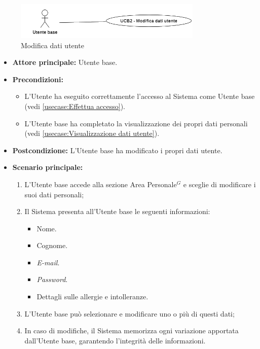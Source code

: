 \label{usecase:Modifica dati utente}

\begin{figure}[h]
	\centering
	\includegraphics[width=0.8\textwidth]{./uml/UCB2.png} 
	\caption{Modifica dati utente}
	\label{fig:UCB2}
  \end{figure}

\begin{itemize}
	\item \textbf{Attore principale:} Utente base.

	\item \textbf{Precondizioni:}
	      \begin{itemize}
		      \item L'Utente ha eseguito correttamente l'accesso al Sistema come Utente base (vedi \autoref{usecase:Effettua accesso}).
		      \item L'Utente base ha completato la visualizzazione dei propri
		            dati personali (vedi \autoref{usecase:Visualizzazione dati utente}).
	      \end{itemize}

	\item \textbf{Postcondizione:} L'Utente base ha modificato i propri dati utente.

	\item \textbf{Scenario principale:}
	      \begin{enumerate}
		      \item L'Utente base accede alla sezione Area Personale$^G$ e sceglie di modificare i suoi dati personali;
		      \item Il Sistema presenta all'Utente base le seguenti informazioni:
		            \begin{itemize}
			            \item Nome.
			            \item Cognome.
			            \item \textit{E-mail}.
			            \item \textit{Password}.
			            \item Dettagli sulle allergie e intolleranze.
		            \end{itemize}
		      \item L'Utente base può selezionare e modificare uno o più di questi dati;
		      \item In caso di modifiche, il Sistema memorizza ogni variazione apportata dall'Utente base, garantendo l'integrità delle informazioni.
	      \end{enumerate}
\end{itemize}
